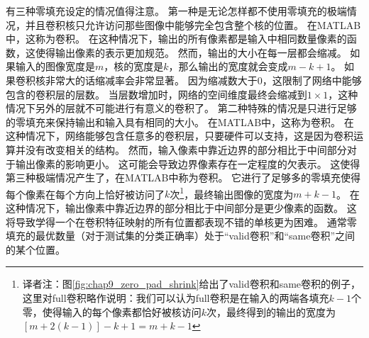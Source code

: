 有三种零填充设定的情况值得注意。
第一种是无论怎样都不使用零填充的极端情况，并且卷积核只允许访问那些图像中能够完全包含整个核的位置。
在MATLAB中，这称为卷积。
在这种情况下，输出的所有像素都是输入中相同数量像素的函数，这使得输出像素的表示更加规范。
然而，输出的大小在每一层都会缩减。
如果输入的图像宽度是$m$，核的宽度是$k$，那么输出的宽度就会变成$m-k+1$。
如果卷积核非常大的话缩减率会非常显著。
因为缩减数大于0，这限制了网络中能够包含的卷积层的层数。
当层数增加时，网络的空间维度最终会缩减到$1\times 1$，这种情况下另外的层就不可能进行有意义的卷积了。
第二种特殊的情况是只进行足够的零填充来保持输出和输入具有相同的大小。
在MATLAB中，这称为卷积。
在这种情况下，网络能够包含任意多的卷积层，只要硬件可以支持，这是因为卷积运算并没有改变相关的结构。
然而，输入像素中靠近边界的部分相比于中间部分对于输出像素的影响更小。
这可能会导致边界像素存在一定程度的欠表示。
这使得第三种极端情况产生了，在MATLAB中称为卷积。
它进行了足够多的零填充使得每个像素在每个方向上恰好被访问了$k$次\footnote{译者注：图\ref{fig:chap9_zero_pad_shrink}给出了\gls{valid}卷积和\gls{same}卷积的例子，这里对\gls{full}卷积略作说明：我们可以认为\gls{full}卷积是在输入的两端各填充$k-1$个零，使得输入的每个像素都恰好被核访问$k$次，最终得到的输出的宽度为$[m+2(k-1)]-k+1=m+k-1$}，最终输出图像的宽度为$m+k-1$。%
在这种情况下，输出像素中靠近边界的部分相比于中间部分是更少像素的函数。
这将导致学得一个在卷积特征映射的所有位置都表现不错的单核更为困难。
通常零填充的最优数量（对于测试集的分类正确率）处于``\gls{valid}卷积''和``\gls{same}卷积''之间的某个位置。

 

